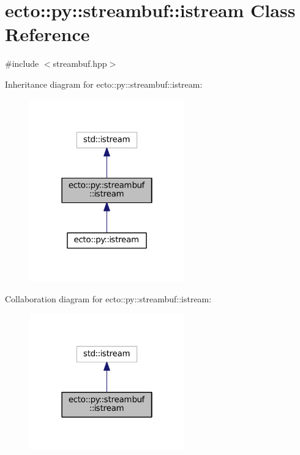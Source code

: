 \hypertarget{classecto_1_1py_1_1streambuf_1_1istream}{}\section{ecto\+:\+:py\+:\+:streambuf\+:\+:istream Class Reference}
\label{classecto_1_1py_1_1streambuf_1_1istream}


{\ttfamily \#include $<$streambuf.\+hpp$>$}



Inheritance diagram for ecto\+:\+:py\+:\+:streambuf\+:\+:istream\+:\nopagebreak
\begin{figure}[H]
\begin{center}
\leavevmode
\includegraphics[width=190pt]{classecto_1_1py_1_1streambuf_1_1istream__inherit__graph}
\end{center}
\end{figure}


Collaboration diagram for ecto\+:\+:py\+:\+:streambuf\+:\+:istream\+:\nopagebreak
\begin{figure}[H]
\begin{center}
\leavevmode
\includegraphics[width=190pt]{classecto_1_1py_1_1streambuf_1_1istream__coll__graph}
\end{center}
\end{figure}
